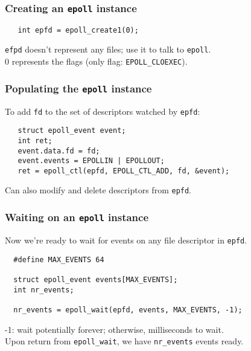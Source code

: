 \documentclass[aspectratio=43]{beamer}
\newenvironment{changemargin}[1]{%
  \begin{list}{}{%
    \setlength{\topsep}{0pt}%
    \setlength{\leftmargin}{#1}%
    \setlength{\rightmargin}{1em}
    \setlength{\listparindent}{\parindent}%
    \setlength{\itemindent}{\parindent}%
    \setlength{\parsep}{\parskip}%
  }%
  \item[]}{\end{list}}
\begin{document}
\begin{frame}[fragile]
  \frametitle{Creating an {\tt epoll} instance}
  \begin{changemargin}{2em}
    \begin{minipage}{.5\textwidth}
    \begin{lstlisting}
   int epfd = epoll_create1(0);
    \end{lstlisting}
    \end{minipage}

    {\tt efpd} doesn't represent any files; use it to talk to {\tt epoll}.\\[1em]

    0 represents the flags (only flag: {\tt EPOLL\_CLOEXEC}).
    
  \end{changemargin}
\end{frame}

\begin{frame}[fragile]
  \frametitle{Populating the {\tt epoll} instance}
  \begin{changemargin}{2em}
    To add {\tt fd} to the set of descriptors watched by {\tt epfd}:
    \begin{lstlisting}
   struct epoll_event event;
   int ret;
   event.data.fd = fd;
   event.events = EPOLLIN | EPOLLOUT;
   ret = epoll_ctl(epfd, EPOLL_CTL_ADD, fd, &event);
    \end{lstlisting}

    Can also modify and delete descriptors from {\tt epfd}.
  \end{changemargin}
\end{frame}

\begin{frame}[fragile]
  \frametitle{Waiting on an {\tt epoll} instance}
  \begin{changemargin}{2em}
    Now we're ready to wait for events on any file descriptor in {\tt epfd}.
    \begin{lstlisting}
  #define MAX_EVENTS 64

  struct epoll_event events[MAX_EVENTS];
  int nr_events;

  nr_events = epoll_wait(epfd, events, MAX_EVENTS, -1);
    \end{lstlisting}

-1: wait potentially forever; otherwise, milliseconds to wait.\\[1em]

Upon return from {\tt epoll\_wait}, we have {\tt nr\_events} events ready.

  \end{changemargin}
\end{frame}
\end{document}
